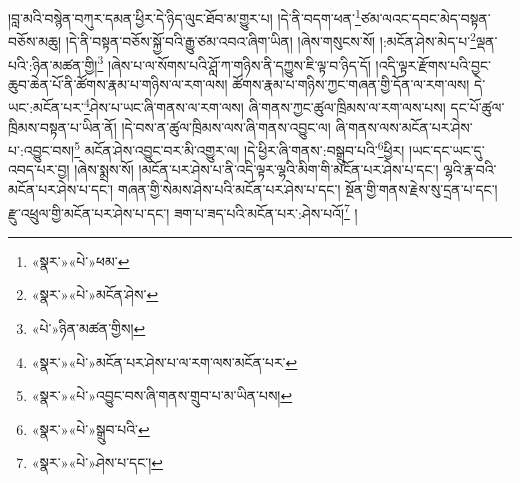 །བླ་མའི་བསྙེན་བཀུར་དམན་ཕྱིར་དེ་ཉིད་ལུང་ཐོབ་མ་གྱུར་པ། །དེ་ནི་བདག་ཕན་\footnote{«སྣར་»«པེ་»ཕམ་}ཙམ་ལའང་དབང་མེད་བསྟན་བཅོས་མཆུ། །དེ་ནི་བསྟན་བཅོས་སྐྱོ་བའི་རྒྱུ་ཙམ་འབའ་ཞིག་ཡིན། །ཞེས་གསུངས་སོ། །:མངོན་ཤེས་མེད་པ་\footnote{«སྣར་»«པེ་»མངོན་ཤེས་}ལྡན་པའི་:ཉིན་མཚན་གྱི།\footnote{«པེ་»ཉིན་མཚན་གྱིས།} །ཞེས་པ་ལ་སོགས་པའི་ཤློ་ཀ་གཉིས་ནི་དཀྱུས་ཇི་ལྟ་བ་ཉིད་དོ། །འདི་ལྟར་རྫོགས་པའི་བྱང་ཆུབ་ཆེན་པོ་ནི་ཚོགས་རྣམ་པ་གཉིས་ལ་རག་ལས། ཚོགས་རྣམ་པ་གཉིས་ཀྱང་གཞན་གྱི་དོན་ལ་རག་ལས། དེ་ཡང་:མངོན་པར་\footnote{«སྣར་»«པེ་»མངོན་པར་ཤེས་པ་ལ་རག་ལས་མངོན་པར་}ཤེས་པ་ཡང་ཞི་གནས་ལ་རག་ལས། ཞི་གནས་ཀྱང་ཚུལ་ཁྲིམས་ལ་རག་ལས་པས། དང་པོ་ཚུལ་ཁྲིམས་བསྟན་པ་ཡིན་ནོ། །དེ་བས་ན་ཚུལ་ཁྲིམས་ལས་ཞི་གནས་འབྱུང་ལ། ཞི་གནས་ལས་མངོན་པར་ཤེས་པ་:འབྱུང་བས།\footnote{«སྣར་»«པེ་»འབྱུང་བས་ཞི་གནས་གྲུབ་པ་མ་ཡིན་པས།} མངོན་ཤེས་འབྱུང་བར་མི་འགྱུར་ལ། །དེ་ཕྱིར་ཞི་གནས་:བསྒྲུབ་པའི་\footnote{«སྣར་»«པེ་»སྒྲུབ་པའི་}ཕྱིར། །ཡང་དང་ཡང་དུ་འབད་པར་བྱ། །ཞེས་སྨྲས་སོ། །མངོན་པར་ཤེས་པ་ནི་འདི་ལྟར་ལྷའི་མིག་གི་མངོན་པར་ཤེས་པ་དང་། ལྷའི་རྣ་བའི་མངོན་པར་ཤེས་པ་དང་། གཞན་གྱི་སེམས་ཤེས་པའི་མངོན་པར་ཤེས་པ་དང་། སྔོན་གྱི་གནས་རྗེས་སུ་དྲན་པ་དང་། རྫུ་འཕྲུལ་གྱི་མངོན་པར་ཤེས་པ་དང་། ཟག་པ་ཟད་པའི་མངོན་པར་:ཤེས་པའོ།\footnote{«སྣར་»«པེ་»ཤེས་པ་དང་།} །
